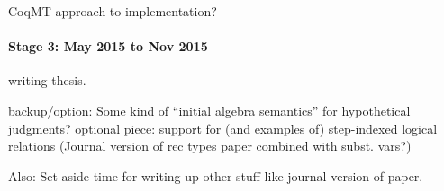 \documentclass{article}
\begin{document}
CoqMT approach to implementation?
\paragraph{Stage 3: May 2015 to Nov 2015} writing thesis.

backup/option: Some kind of ``initial algebra semantics'' for hypothetical judgments?
optional piece: support for (and examples of) step-indexed logical relations
(Journal version of rec types paper combined with subst. vars?)

Also: Set aside time for writing up other stuff like journal version
of paper.



\end{document}
